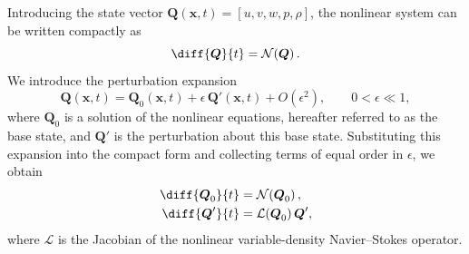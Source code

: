 Introducing the state vector \(\boldsymbol{Q}(\boldsymbol{x},t) = \left[ u, v, w, p, \rho \right]\), the nonlinear system can be written compactly as
\begin{equation}
    \label{eq:vd_compact_nl_continuous}
    \diff{\boldsymbol{Q}}{t} = \mathcal{N}\!\left( \boldsymbol{Q} \right).
\end{equation}
We introduce the perturbation expansion
\begin{equation}
    \label{eq:vd_perturbation_expansion}
    \boldsymbol{Q}(\boldsymbol{x},t) = \boldsymbol{Q}_0(\boldsymbol{x},t) + \epsilon\,\boldsymbol{Q}'(\boldsymbol{x},t) + O(\epsilon^2),
    \qquad 0 < \epsilon \ll 1,
\end{equation}
where \(\boldsymbol{Q}_0\) is a solution of the nonlinear equations, hereafter referred to as the base state, and \(\boldsymbol{Q}'\) is the perturbation about this base state. Substituting this expansion into the compact form and collecting terms of equal order in \(\epsilon\), we obtain
\begin{subequations}
    \label{eq:vd_compact_lin_continuous}
    \begin{align}
        \label{eq:vd_compact_lin_continuous_0th}
        \diff{\boldsymbol{Q}_0}{t} &= \mathcal{N}\!\left( \boldsymbol{Q}_0 \right), \\
        \label{eq:vd_compact_lin_continuous_1th}
        \diff{\boldsymbol{Q}'}{t} &= \mathcal{L}(\boldsymbol{Q}_0)\,\boldsymbol{Q}',
    \end{align}
\end{subequations}
where \(\mathcal{L}\) is the Jacobian of the nonlinear variable-density Navier--Stokes operator.

